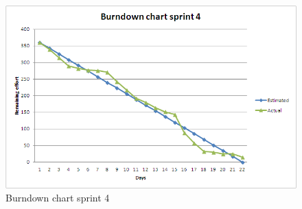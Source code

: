 \begin{figure}[h!]
	\includegraphics[width=\textwidth]{burndown4.png}
	\caption{Burndown chart sprint 4}
	\label{fig:burndown3}
\end{figure}